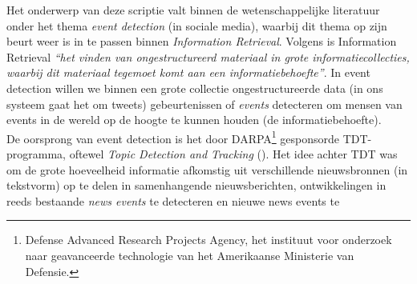 \documentclass[a4paper,10pt,titlepage]{article}
\def\vl{\\[9pt]}                              %
\def\it{\textit}                              %
\begin{document}
Het onderwerp van deze scriptie valt binnen de wetenschappelijke literatuur 
onder het thema \it{event detection} (in sociale media), waarbij dit thema op zijn beurt weer is in te 
passen binnen \it{Information Retrieval}. Volgens \citeauthor{manning2008introduction} is Information 
Retrieval \it{“het vinden van ongestructureerd materiaal in grote 
informatiecollecties, waarbij dit materiaal tegemoet komt aan een 
informatiebehoefte”}. In event detection willen we binnen een grote collectie 
ongestructureerde data (in ons systeem gaat het om tweets) 
gebeurtenissen of \it{events} detecteren om mensen van events in de wereld op de 
hoogte te kunnen houden (de informatiebehoefte). 
\vl
De oorsprong van event detection is het door DARPA\footnote{Defense Advanced Research Projects Agency, het instituut voor onderzoek naar geavanceerde technologie van het Amerikaanse Ministerie van Defensie.} gesponsorde TDT-programma, 
oftewel \it{Topic Detection and Tracking} (\citealt{atefeh2013survey}). Het idee achter TDT was om 
de grote hoeveelheid informatie afkomstig uit verschillende 
nieuwsbronnen (in tekstvorm) op te delen in samenhangende nieuwsberichten, ontwikkelingen in 
reeds bestaande \it{news events} te detecteren en nieuwe news events te 
\end{document}
